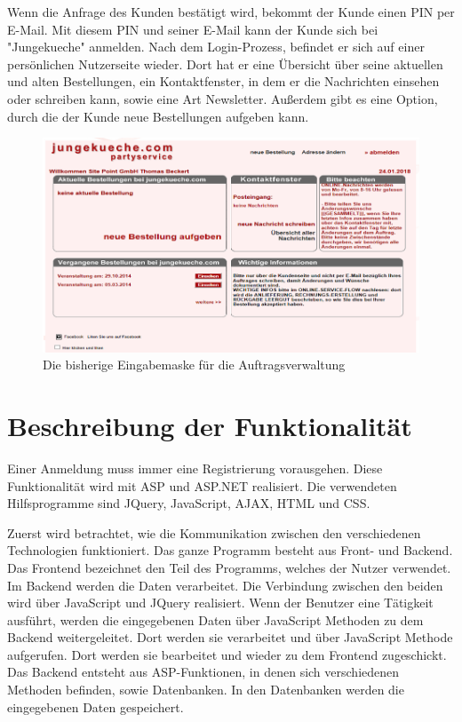 Wenn die Anfrage des Kunden bestätigt wird, bekommt der Kunde einen PIN per E-Mail. Mit diesem PIN und seiner E-Mail kann der Kunde sich bei "Jungekueche" anmelden. Nach dem Login-Prozess, befindet er sich auf einer persönlichen Nutzerseite wieder. Dort hat er eine Übersicht über seine aktuellen und alten Bestellungen, ein Kontaktfenster, in dem er die Nachrichten einsehen oder schreiben kann, sowie eine Art Newsletter. Außerdem gibt es eine Option, durch die der Kunde neue Bestellungen aufgeben kann.  

\begin{figure}[h]
	\centering
	\includegraphics[width=0.7\linewidth]{Graphics/KundenAnsicht.png}
	\caption[Kundeansicht]{Die bisherige Eingabemaske für die Auftragsverwaltung}
	\label{fig:KundenAnsicht}
\end{figure}

\section{Beschreibung der Funktionalität}   

Einer Anmeldung muss immer eine Registrierung vorausgehen. Diese Funktionalität wird mit ASP und ASP.NET realisiert. Die verwendeten Hilfsprogramme sind JQuery, JavaScript, AJAX, HTML und CSS. 

Zuerst wird betrachtet, wie die Kommunikation zwischen den verschiedenen Technologien funktioniert. Das ganze Programm besteht aus Front- und Backend. Das Frontend bezeichnet den Teil des Programms, welches der Nutzer verwendet. Im Backend werden die Daten verarbeitet. Die Verbindung zwischen den beiden wird über JavaScript und JQuery realisiert. Wenn der Benutzer eine Tätigkeit ausführt, werden die eingegebenen Daten über JavaScript Methoden zu dem Backend weitergeleitet. Dort werden sie verarbeitet und über JavaScript Methode aufgerufen. Dort werden sie bearbeitet und wieder zu dem Frontend zugeschickt. Das Backend entsteht aus ASP-Funktionen, in denen sich verschiedenen Methoden befinden, sowie Datenbanken. In den Datenbanken werden die eingegebenen Daten gespeichert.

